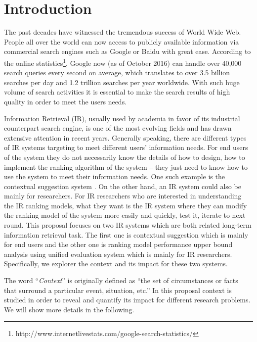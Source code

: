 %
%
\chapter{Introduction}
The past decades have witnessed the tremendous success of World Wide Web. 
People all over the world can now access to publicly available 
information via commercial search engines such as Google or Baidu 
with great ease. According to the online 
statistics\footnote{http://www.internetlivestats.com/google-search-statistics/}, 
Google now (as of October 2016) can handle over 40,000 search queries 
every second on average, which translates to over 3.5 billion searches 
per day and 1.2 trillion searches per year worldwide. 
With such huge volume of search activities it is essential to make the 
search results of high quality in order to meet the users needs.

Information Retrieval (IR), usually used by academia in favor of its 
industrial counterpart search engine, is one of the most evolving fields 
and has drawn extensive attention in recent years.
Generally speaking, there are different types of IR systems targeting to meet 
different users' information needs. 
For end users of the system they do not necessarily know the details of 
how to design, how to implement the ranking algorithm of the system -- 
they just need to know how to use the system to meet their information needs. 
One such example is the contextual suggestion system 
\cite{udel:treccs2013, udel:treccs2014, udel:treccs2015, 
Yang:2013:OUP:2499178.2499191, Yang2015}.
On the other hand, an IR system could also be mainly for researchers. 
For IR researchers who are interested in understanding the IR ranking models, 
what they want is the IR system where they can modify the ranking model of 
the system more easily and quickly, test it, iterate to next round.
This proposal focuses on two IR systems which are both related long-term 
information retrieval task. The first one is contextual suggestion which is 
mainly for end users and the other one is ranking model performance upper 
bound analysis using unified evaluation system which is mainly for IR 
researchers. Specifically, we explorer the context and its impact for these 
two systems.

The word ``\textit{Context}'' is originally defined as 
``the set of circumstances or facts that surround a particular event, 
situation, etc.''
In this proposal context is studied in order to reveal and quantify 
its impact for different research problems. We will show more details 
in the following.

